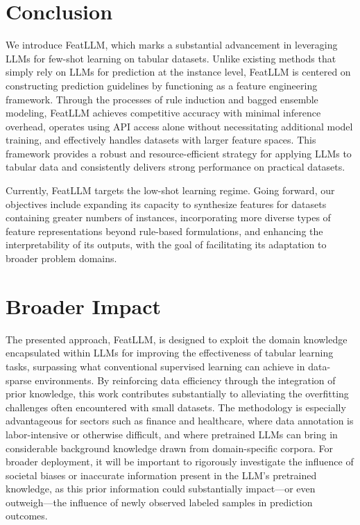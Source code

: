 \section{Conclusion}
We introduce \textsf{FeatLLM}, which marks a substantial advancement in leveraging LLMs for few-shot learning on tabular datasets. Unlike existing methods that simply rely on LLMs for prediction at the instance level, \textsf{FeatLLM} is centered on constructing prediction guidelines by functioning as a feature engineering framework. Through the processes of rule induction and bagged ensemble modeling, \textsf{FeatLLM} achieves competitive accuracy with minimal inference overhead, operates using API access alone without necessitating additional model training, and effectively handles datasets with larger feature spaces. This framework provides a robust and resource-efficient strategy for applying LLMs to tabular data and consistently delivers strong performance on practical datasets.

Currently, \textsf{FeatLLM} targets the low-shot learning regime. Going forward, our objectives include expanding its capacity to synthesize features for datasets containing greater numbers of instances, incorporating more diverse types of feature representations beyond rule-based formulations, and enhancing the interpretability of its outputs, with the goal of facilitating its adaptation to broader problem domains.

\section{Broader Impact}
The presented approach, \textsf{FeatLLM}, is designed to exploit the domain knowledge encapsulated within LLMs for improving the effectiveness of tabular learning tasks, surpassing what conventional supervised learning can achieve in data-sparse environments. By reinforcing data efficiency through the integration of prior knowledge, this work contributes substantially to alleviating the overfitting challenges often encountered with small datasets. The methodology is especially advantageous for sectors such as finance and healthcare, where data annotation is labor-intensive or otherwise difficult, and where pretrained LLMs can bring in considerable background knowledge drawn from domain-specific corpora. For broader deployment, it will be important to rigorously investigate the influence of societal biases or inaccurate information present in the LLM’s pretrained knowledge, as this prior information could substantially impact—or even outweigh—the influence of newly observed labeled samples in prediction outcomes.

